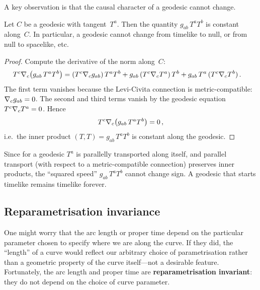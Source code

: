 A key observation is that the causal character of a geodesic
cannot change.

\begin{theorem}%
\label{thm:geodesic-norm-constant}
  Let $C$ be a geodesic with tangent~$T^a$.  Then the quantity
  $g_{ab}\,T^a T^b$ is constant along~$C$.  In particular, a
  geodesic cannot change from timelike to null, or from null to
  spacelike, etc.
\end{theorem}

\begin{proof}
  Compute the derivative of the norm along~$C$:
  \begin{align}
    T^c\nabla_c\bigl(g_{ab}\,T^a T^b\bigr)
      &= (T^c\nabla_c g_{ab})\,T^a T^b
        + g_{ab}\,(T^c\nabla_c T^a)\,T^b
        + g_{ab}\,T^a\,(T^c\nabla_c T^b)\,.
        \label{eq:norm-deriv}
  \end{align}
  The first term vanishes because the Levi-Civita connection is
  metric-compatible: $\nabla_c g_{ab} = 0$.  The second and third
  terms vanish by the geodesic equation $T^c\nabla_c T^a = 0$.
  Hence
  \[
    T^c\nabla_c\bigl(g_{ab}\,T^a T^b\bigr) = 0\,,
  \]
  i.e.\ the inner product $(T,T) = g_{ab}\,T^a T^b$ is constant
  along the geodesic.
\end{proof}

\begin{intuition}
  Since for a geodesic $T^a$ is parallelly transported along
  itself, and parallel transport (with respect to a
  metric-compatible connection) preserves inner products, the
  ``squared speed'' $g_{ab}\,T^a T^b$ cannot change sign.  A
  geodesic that starts timelike remains timelike forever.
\end{intuition}

\subsection{Reparametrisation invariance}%
\label{sec:reparam-invariance}

One might worry that the arc length or proper time depend on the
particular parameter chosen to specify where we are along the
curve.  If they did, the ``length'' of a curve would reflect our
arbitrary choice of parametrisation rather than a geometric
property of the curve itself---not a desirable feature.
Fortunately, the arc length and proper time are
\textbf{reparametrisation invariant}: they do not depend on the
choice of curve parameter.

